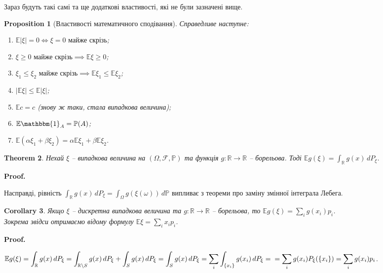 \documentclass[a4paper, 10pt]{article}
\makeatletter
\theoremstyle{theoremdd}
\newtheorem{theorem}{Theorem}[subsection]
\newtheorem{proposition}[theorem]{Proposition}
\newtheorem{corollary}[theorem]{Corollary}
\renewenvironment{proof}[1][Proof.\\]{\par
\pushQED{\hfill \qed}%
\normalfont \topsep6\p@\@plus6\p@\relax
\trivlist
\item\relax
{\bfseries
#1\@addpunct{.}}\hspace\labelsep\ignorespaces
}{%
\popQED\endtrivlist\@endpefalse
}
\makeatother
\begin{document}
\noindent Зараз будуть такі самі та ще додаткові властивості, які не були зазначені вище.

\begin{proposition}[Властивості математичного сподівання]
Справедливе наступне:
\begin{enumerate}[nosep,wide=0pt,label={\arabic*)}]
\item $\mathbb{E} |\xi| = 0 \iff \xi = 0 \text{ майже скрізь}$;
\item $\xi \geq 0 \text{ майже скрізь} \implies \mathbb{E}\xi \geq 0$;
\item $\xi_1 \leq \xi_2 \text{ майже скрізь} \implies \mathbb{E}\xi_1 \leq \mathbb{E}\xi_2$;
\item $|\mathbb{E}\xi| \leq \mathbb{E}|\xi|$;
\item $\mathbb{E} c = c$ (знову ж таки, стала випадкова величина);
\item $\mathbb{E}\mathbbm{1}_A = \mathbb{P}(A)$;
\item $\mathbb{E}(\alpha \xi_1 + \beta \xi_2) = \alpha \mathbb{E}\xi_1 + \beta \mathbb{E}\xi_2$.
\end{enumerate}
\end{proposition}

\begin{theorem}
Нехай $\xi$ -- випадкова величина на $(\Omega,\mathcal{F},\mathbb{P})$ та функція $g \colon \mathbb{R} \to \mathbb{R}$ -- борельова. Тоді $\displaystyle\mathbb{E} g(\xi) = \int_{\mathbb{R}} g(x)\,dP_\xi$.
\end{theorem}

\begin{proof}
Насправді, рівність $\displaystyle\int_{\mathbb{R}}g(x)\,dP_\xi = \int_{\Omega} g(\xi(\omega))\,d\mathbb{P}$ випливає з теореми про заміну змінної інтеграла Лебега.
\end{proof}

\begin{corollary}
Якщо $\xi$ -- дискретна випадкова величина та $g \colon \mathbb{R} \to \mathbb{R}$ -- борельова, то $\mathbb{E} g(\xi) = \displaystyle\sum_i g(x_i) p_i$.\\
Зокрема звідси отримаємо відому формулу $\mathbb{E}\xi = \displaystyle\sum_i x_i p_i$.
\end{corollary}

\begin{proof}
$\mathbb{E}g(\xi) = \displaystyle\int_{\mathbb{R}} g(x)\,dP_{\xi} = \int_{\mathbb{R} \setminus S} g(x)\,dP_{\xi} + \int_S g(x)\,dP_{\xi} = \int_S g(x)\,dP_\xi = \sum_i \int_{\{x_i\}} g(x_i)\,dP_{\xi} = \\
= \sum_i g(x_i) P_{\xi}(\{x_i\}) = \sum_i g(x_i) p_i$.
\end{proof}
\end{document}
